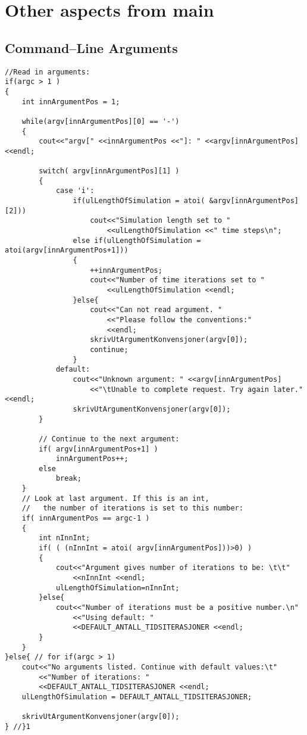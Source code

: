 \chapter{Other aspects from main} %

\section{Command--Line Arguments}
\label{appendixCommandLineArguments}
\begin{lstlisting}
//Read in arguments:
if(argc > 1 ) 
{
	int innArgumentPos = 1;

	while(argv[innArgumentPos][0] == '-')
	{
		cout<<"argv[" <<innArgumentPos <<"]: " <<argv[innArgumentPos] <<endl;

		switch( argv[innArgumentPos][1] )
		{
			case 'i':
				if(ulLengthOfSimulation = atoi( &argv[innArgumentPos][2]))
					cout<<"Simulation length set to " 
						<<ulLengthOfSimulation <<" time steps\n";
				else if(ulLengthOfSimulation = atoi(argv[innArgumentPos+1]))
				{
					++innArgumentPos;
					cout<<"Number of time iterations set to " 
						<<ulLengthOfSimulation <<endl;
				}else{
					cout<<"Can not read argument. "
						<<"Please follow the conventions:" 
						<<endl;
					skrivUtArgumentKonvensjoner(argv[0]);
					continue;
				}
			default:
				cout<<"Unknown argument: " <<argv[innArgumentPos] 
					<<"\tUnable to complete request. Try again later." <<endl;
				skrivUtArgumentKonvensjoner(argv[0]);
		}

		// Continue to the next argument:
		if( argv[innArgumentPos+1] ) 
			innArgumentPos++;
		else 
			break;
	}
	// Look at last argument. If this is an int, 
	// 	 the number of iterations is set to this number:
	if( innArgumentPos == argc-1 )
	{
		int nInnInt;
		if( ( (nInnInt = atoi( argv[innArgumentPos]))>0) )
		{
			cout<<"Argument gives number of iterations to be: \t\t" 
				<<nInnInt <<endl;
			ulLengthOfSimulation=nInnInt;
		}else{
			cout<<"Number of iterations must be a positive number.\n"
				<<"Using default: "
				<<DEFAULT_ANTALL_TIDSITERASJONER <<endl;
		}
	}
}else{ // for if(argc > 1)
	cout<<"No arguments listed. Continue with default values:\t"
		<<"Number of iterations: "
		<<DEFAULT_ANTALL_TIDSITERASJONER <<endl;
	ulLengthOfSimulation = DEFAULT_ANTALL_TIDSITERASJONER;

	skrivUtArgumentKonvensjoner(argv[0]);
} //}1
\end{lstlisting}
